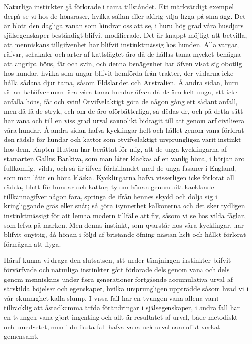 Naturliga instinkter gå förlorade i tama tillståndet. Ett märkvärdigt exempel derpå se vi hos de hönsraser, hvilka sällan eller aldrig vilja ligga på sina ägg. Det är blott den dagliga vanan som hindrar oss att se, i huru hög grad våra husdjurs själsegenskaper beständigt blifvit modifierade. Det är knappt möjligt att betvifla, att menniskans tillgifvenhet har blifvit instinktmässig hos hunden. Alla vargar, räfvar, schakaler och arter af kattslägtet äro då de hållas tama mycket benägna att angripa höns, får och svin, och denna benägenhet har äfven visat sig obotlig hos hundar, hvilka som ungar blifvit hemförda från trakter, der vildarna icke hålla sådana djur tama, såsom Eldslandet och Australien. Å andra sidan, huru sällan behöfver man lära våra tama hundar äfven då de äro helt unga, att icke anfalla höns, får och svin! Otvifvelaktigt göra de någon gång ett sådant anfall, men då få de stryk, och om de äro oförbätterliga, så dödas de, och på detta sätt har vana och till en viss grad urval sannolikt bidragit till att genom arf civilisera våra hundar. Å andra sidan hafva kycklingar helt och hållet genom vana förlorat den rädsla för hundar och kattor som otvifvelaktigt ursprungligen varit instinkt hos dem. Kapten Hutton har berättat för mig, att de unga kycklingarna af stamarten Gallus Bankiva, som man låter kläckas af en vanlig höna, i början äro fullkomligt vilda, och så är äfven förhållandet med de unga fasaner i England, som man låtit en höna kläcka. Kycklingarna hafva visserligen icke förlorat all rädsla, blott för hundar och kattor; ty om hönan genom sitt kacklande tillkännagifver någon fara, springa de ifrån hennes skydd och dölja sig i kringliggande gräs eller snår; så göra isynnerhet kalkonerna och det sker tydligen instinktmässigt för att lemna modern tillfälle att fly, såsom vi se hos vilda fåglar, som lefva på marken. Men denna instinkt, som qvarstår hos våra kycklingar, har blifvit onyttig, då hönan i följd af bristande öfning nästan helt och hållet förlorat förmågan att flyga.

Häraf kunna vi draga den slutsatsen, att under tämjningen instinkter blifvit förvärfvade och naturliga instinkter gått förlorade dels genom vana och dels genom menniskans under flera generationer fortgående accumulativa urval af särskilda böjelser och egenskaper, hvilka ursprungligen uppträdde såsom hvad vi i vår okunnighet kalla slump. I vissa fall har en tvungen vana allena varit tillräcklig att åstadkomma ärfda förändringar i själsegenskaper, i andra fall har en tvungen vana gjort ingenting och allt är resultatet af urval, både metodiskt och omedvetet, men i de flesta fall hafva vana och urval sannolikt verkat gemensamt.



